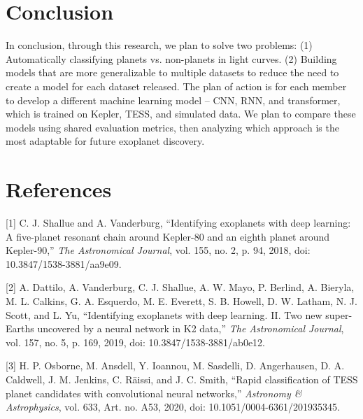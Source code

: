\documentclass[letterpaper]{article}
\begin{document}
\section*{Conclusion}
In conclusion, through this research, we plan to solve two problems: (1) Automatically classifying planets vs. non-planets in light curves. (2) Building models that are more generalizable to multiple datasets to reduce the need to create a model for each dataset released. The plan of action is for each member to develop a different machine learning model – CNN, RNN, and transformer, which is trained on Kepler, TESS, and simulated data. We plan to compare these models using shared evaluation metrics, then analyzing which approach is the most adaptable for future exoplanet discovery.

\section*{References}
[1] C. J. Shallue and A. Vanderburg, ``Identifying exoplanets with deep learning: A five-planet resonant chain around Kepler-80 and an eighth planet around Kepler-90,'' \textit{The Astronomical Journal}, vol. 155, no. 2, p. 94, 2018, doi: 10.3847/1538-3881/aa9e09.

[2] A. Dattilo, A. Vanderburg, C. J. Shallue, A. W. Mayo, P. Berlind, A. Bieryla, M. L. Calkins, G. A. Esquerdo, M. E. Everett, S. B. Howell, D. W. Latham, N. J. Scott, and L. Yu, ``Identifying exoplanets with deep learning. II. Two new super-Earths uncovered by a neural network in K2 data,'' \textit{The Astronomical Journal}, vol. 157, no. 5, p. 169, 2019, doi: 10.3847/1538-3881/ab0e12.

[3] H. P. Osborne, M. Ansdell, Y. Ioannou, M. Sasdelli, D. Angerhausen, D. A. Caldwell, J. M. Jenkins, C. Räissi, and J. C. Smith, ``Rapid classification of TESS planet candidates with convolutional neural networks,'' \textit{Astronomy \& Astrophysics}, vol. 633, Art. no. A53, 2020, doi: 10.1051/0004-6361/201935345.
\end{document}
